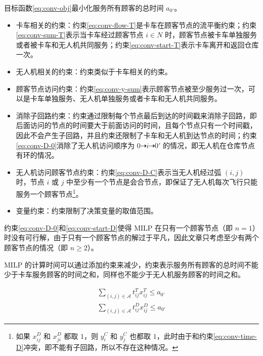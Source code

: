 \documentclass[fontset=none]{ctexart}
\begin{document}
目标函数\cref{eq:conv-obj}最小化服务所有顾客的总时间 $a_{0'}$。

\begin{itemize}
    \item 卡车相关的约束：约束\cref{eq:conv-flow-T}是卡车在顾客节点的流平衡约束；约束\cref{eq:conv-sum-T}表示当卡车经过顾客节点 $i \in N$ 时，顾客节点被卡车单独服务或者被卡车和无人机共同服务；约束\cref{eq:conv-start-T}表示卡车离开和返回仓库一次。
    \item 无人机相关的约束：约束类似于卡车相关的约束。
    \item 顾客节点访问约束：约束\cref{eq:conv-y-sum}表示顾客节点被至少服务过一次，可以是卡车单独服务、无人机单独服务或者卡车和无人机共同服务。
    \item 消除子回路约束：约束通过限制每个节点最后到达的时间戳来消除子回路，即后面访问的节点的时间要大于前面访问的时间，且每个节点只有一个时间戳，因此不会产生子回路，并且约束还限制了卡车和无人机到达节点的时间；约束\cref{eq:conv-D-0}消除了无人机访问顺序为 $0 \dashrightarrow i \dashrightarrow 0'$ 的情况，即无人机在仓库节点有环的情况。 
    \item 无人机访问顾客节点约束：约束\cref{eq:conv-D-C}表示当无人机经过弧 $(i, j)$ 时，节点 $i$ 或 $j$ 中至少有一个节点是会合节点，即保证了无人机每次飞行只能服务一个顾客节点\footnote{如果 $x_{ij}^D$ 和 $x_{ji}^D$ 都取 $1$，则 $y_i^C$ 和 $y_j^C$ 也都取 $1$，此时由于和约束\cref{eq:conv-time-D}冲突，即不能有子回路，所以不存在这种情况。}。 
    \item 变量约束：约束限制了决策变量的取值范围。
\end{itemize}

约束\cref{eq:conv-D-0}和\cref{eq:conv-start-D}使得 MILP 在只有一个顾客节点（即 $n = 1$）时没有可行解，由于只有一个顾客节点的解过于平凡，因此文章只考虑至少有两个顾客节点的情况（即 $n \geq 2$）。

MILP 的计算时间可以通过添加约束来减少，约束表示服务所有顾客的总时间不能少于卡车服务顾客的时间之和，同样也不能少于无人机服务顾客的时间之和。

\begin{corollary}
    \begin{align}
        \sum_{(i, j) \in \mathcal{A}} t_{ij}^Tx_{ij}^T \leq a_{0'} \tag{1p}\label{eq:conv-add-T}\\
        \sum_{(i, j) \in \mathcal{A}} t_{ij}^Dx_{ij}^D \leq a_{0'} \tag{1q}\label{eq:conv-add-D}
    \end{align}
\end{corollary}
\end{document}
